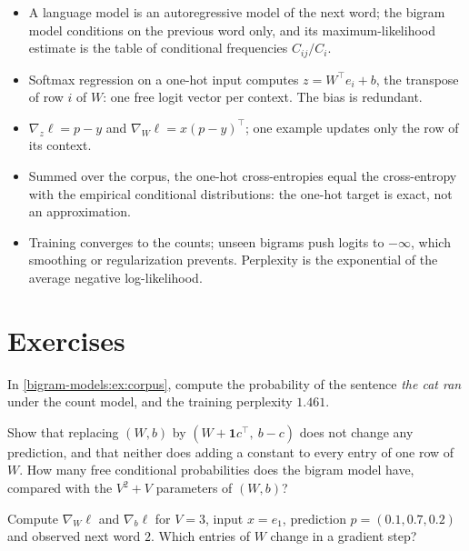 \begin{notechapter}
\begin{chaptersummary}
\begin{itemize}
  \item A language model is an autoregressive model of the next word; the bigram model
        conditions on the previous word only, and its maximum-likelihood estimate is the table
        of conditional frequencies $C_{ij}/C_i$.
  \item Softmax regression on a one-hot input computes $z = W^\top e_i + b$, the transpose of row $i$ of $W$: one free
        logit vector per context. The bias is redundant.
  \item $\nabla_z\ell = p - y$ and $\nabla_W\ell = x(p - y)^\top$; one example updates only the row of its context.
  \item Summed over the corpus, the one-hot cross-entropies equal the cross-entropy with the
        empirical conditional distributions: the one-hot target is exact, not an approximation.
  \item Training converges to the counts; unseen bigrams push logits to $-\infty$, which smoothing or
        regularization prevents. Perplexity is the exponential of the average negative
        log-likelihood.
\end{itemize}
\end{chaptersummary}

\section*{Exercises}

\begin{exercise}\label{bigram-models:exr:1}
In \cref{bigram-models:ex:corpus}, compute the probability of the sentence \emph{the cat ran} under the count
model, and the training perplexity $1.461$.
\end{exercise}

\begin{exercise}\label{bigram-models:exr:2}
Show that replacing $(W, b)$ by $(W + \mathbf 1c^\top,\ b - c)$ does not change any prediction, and that neither
does adding a constant to every entry of one row of $W$. How many free conditional probabilities
does the bigram model have, compared with the $V^2 + V$ parameters of $(W, b)$?
\end{exercise}

\begin{exercise}\label{bigram-models:exr:3}
Compute $\nabla_W\ell$ and $\nabla_b\ell$ for $V = 3$, input $x = e_1$, prediction $p = (0.1, 0.7, 0.2)$ and observed next word $2$.
Which entries of $W$ change in a gradient step?
\end{exercise}


\end{notechapter}
